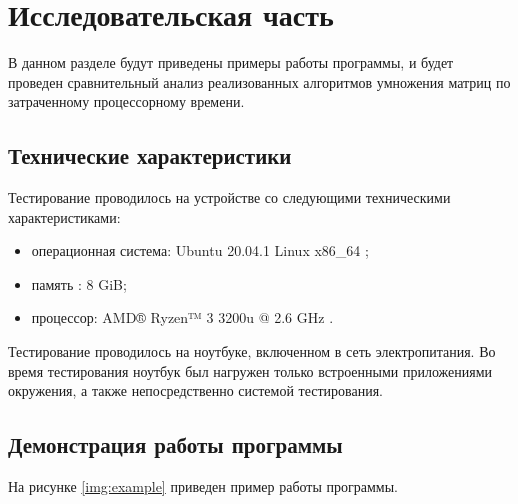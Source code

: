 \chapter{Исследовательская часть}

В данном разделе будут приведены примеры работы программы, и будет проведен сравнительный анализ реализованных алгоритмов умножения матриц по затраченному процессорному времени.

\section{Технические характеристики}

Тестирование проводилось на устройстве со следующими техническими характеристиками:

\begin{itemize}
	\item операционная система: Ubuntu 20.04.1 Linux x86\_64 \cite{linux};
	\item память : 8 GiB;
	\item процессор: AMD® Ryzen™ 3 3200u @ 2.6 GHz \cite{amd}.
\end{itemize}

Тестирование проводилось на ноутбуке, включенном в сеть электропитания. Во время тестирования ноутбук был нагружен только встроенными приложениями окружения, а также непосредственно системой тестирования.

\clearpage

\section{Демонстрация работы программы}

На рисунке \ref{img:example} приведен пример работы программы.

